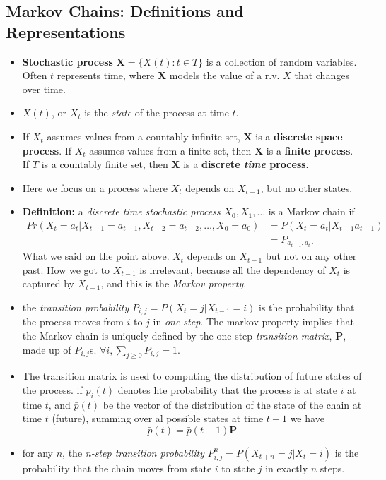 \documentclass[10pt]{article}
\newcounter{set}
\begin{document}
\subsection{Markov Chains: Definitions and Representations}
\label{sec:7.1}
\begin{itemize}
\item \textbf{Stochastic process} $\mathbf{X} = \{X(t): t\in T\}$ is a collection of random variables. Often $t$ represents time, where $\mathbf{X}$ models the value of a r.v. $X$ that changes over time.
\item $X(t)$, or $X_t$ is the \emph{state} of the process at time $t$.
\item If $X_t$ assumes values from a countably infinite set, $\mathbf{X}$ is a \textbf{discrete space process}. If $X_t$ assumes values from a finite set, then $\mathbf{X}$ is a \textbf{finite process}. If $T$ is a countably finite set, then $\mathbf{X}$ is a \textbf{discrete \emph{time} process}.
\item Here we focus on a process where $X_t$ depends on $X_{t-1}$, but no other states.
\item \textbf{Definition:} a \emph{discrete time stochastic process} $X_0, X_1, \dots$ is a Markov chain if 
  \begin{align*}
Pr(X_t = a_t | X_{t-1} = a_{t-1}, X_{t-2} = a_{t-2}, \dots, X_0 = a_0) &= P(X_t = a_t | X_{t-1} a_{t-1})\\
&= P_{a_{t-1}, a_t\cdot}
  \end{align*} What we said on the point above. $X_t$ depends on $X_{t-1}$ but not on any other past. How we got to $X_{t-1}$ is irrelevant, because all the dependency of $X_t$ is captured by $X_{t-1}$, and this is the \emph{Markov property}.
\item the \emph{transition probability} $P_{i,j} = P(X_t = j | X_{t-1} = i)$ is the probability that the process moves from $i$ to $j$ in \emph{one step}. The markov property implies that the Markov chain is uniquely defined by the one step \emph{transition matrix}, $\mathbf{P}$, made up of $P_{i,j}$s. $\forall i, \sum_{j\ge 0} P_{i,j} = 1$.
\item The transition matrix is used to computing the distribution of future states of the process. if $p_i(t)$ denotes hte probability that the process is at state \textbf{$i$} at time $t$, and $\bar{p}(t)$ be the vector of the distribution of the state of the chain at time $t$ (future), summing over al possible states at time $t-1$ we have $$\bar{p}(t) = \bar{p}(t-1)\mathbf{P}$$
\item for any $n$, the \emph{n-step transition probability} $P^n_{i,j} = P(X_{t+n} = j | X_t = i)$ is the probability that the chain moves from state $i$ to state $j$ in exactly $n$ steps.

\end{itemize}
\end{document}
